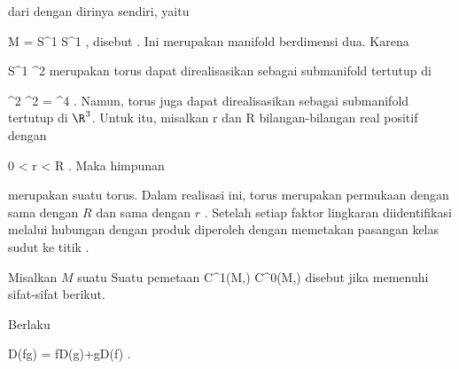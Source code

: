 {

dari
dengan dirinya sendiri, yaitu

\mavergleichskette
{\vergleichskette
{ M
}
{ = }{ S^1 \times S^1
}
{  }{
}
{    }{
}
{   }{
}
}
{}{}{,}
disebut  {.} Ini merupakan manifold berdimensi dua. Karena

\mavergleichskette
{\vergleichskette
{ S^1
}
{ \subset }{ \R^2
}
{  }{
}
{    }{
}
{   }{
}
}
{}{}{}
merupakan
torus dapat direalisasikan sebagai submanifold tertutup di

\mavergleichskette
{\vergleichskette
{ \R^2 \times \R^2
}
{ = }{ \R^4
}
{  }{
}
{    }{
}
{   }{
}
}
{}{}{.}
Namun, torus juga dapat direalisasikan sebagai submanifold tertutup di $\R^3$. Untuk itu, misalkan
\mathkor {} {r} {dan} {R} {}
bilangan-bilangan real positif dengan

\mavergleichskette
{\vergleichskette
{ 0
}
{ < }{ r
}
{ < }{ R
}
{    }{
}
{   }{
}
}
{}{}{.}
Maka himpunan

 {  }

merupakan suatu torus. Dalam realisasi ini, torus merupakan permukaan
 {} {}
 dengan  sama dengan $R$ dan  sama dengan $r$
 {} {.}
Setelah setiap faktor lingkaran diidentifikasi melalui
hubungan dengan produk
 diperoleh dengan memetakan pasangan kelas sudut
\mathl{([ \varphi ],[ \psi ])}{} ke titik
.

}


{}
{

Misalkan $M$ suatu
Suatu pemetaan
 {C^1(M,\R) } { C^0(M,\R)
} {}
disebut
jika memenuhi sifat-sifat berikut.
 {Berlaku

\mavergleichskette
{\vergleichskette
{ D(fg)
}
{ = }{ fD(g)+gD(f)
}
{  }{
}
{    }{
}
{   }{
}
}
{}{}{.}
}

}

